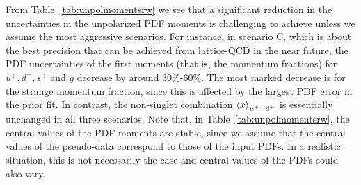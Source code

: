 From Table~\ref{tab:unpolmomentsrw} we see that a significant
reduction in the uncertainties in the unpolarized PDF moments is challenging 
to achieve unless we assume the most aggressive scenarios.
%
For instance, in scenario C, which is about the best precision that
can be achieved from lattice-QCD in the near future, the PDF uncertainties 
of the first moments (that is, the momentum fractions) for $u^+,d^+,s^+$ and 
$g$ decrease by around 30\%-60\%.
%
The most marked decrease is for the strange momentum fraction, since this is 
affected by the largest PDF error in the prior fit.
%
In contrast, the non-singlet combination $\left\langle x\right\rangle_{u^+-d^+}$ is essentially
unchanged in all three scenarios.
%
Note that, in Table~\ref{tab:unpolmomentsrw}, the central values of the PDF 
moments are stable, since we assume that the central values of the 
pseudo-data correspond to those of the input PDFs. 
%
In a realistic situation, this is not necessarily the case and 
central values of the PDFs could also vary.

